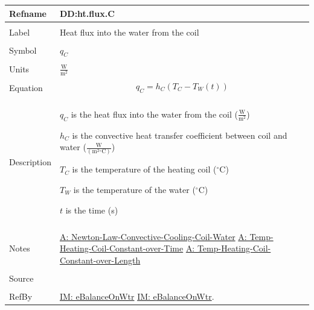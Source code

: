 \documentclass[12pt]{article}
\begin{document}
\noindent \begin{minipage}{\textwidth}
\begin{tabular}{p{} p{}}
\toprule \textbf{Refname} & \textbf{DD:ht.flux.C}
\label{DD:ht.flux.C}
\\ \midrule \\
Label & Heat flux into the water from the coil
\\ \midrule \\
Symbol & ${q_{C}}$
\\ \midrule \\
Units & $\frac{\text{W}}{\text{m}^{2}}$
\\ \midrule \\
Equation & \begin{displaymath}
           {q_{C}}={h_{C}} \left({T_{C}}-{T_{W}}\left(t\right)\right)
           \end{displaymath}
\\ \midrule \\
Description & \begin{symbDescription}
              \item{${q_{C}}$ is the heat flux into the water from the coil ($\frac{\text{W}}{\text{m}^{2}}$)}
              \item{${h_{C}}$ is the convective heat transfer coefficient between coil and water ($\frac{\text{W}}{(\text{m}^{2}{}^{\circ}\text{C})}$)}
              \item{${T_{C}}$ is the temperature of the heating coil (${}^{\circ}$C)}
              \item{${T_{W}}$ is the temperature of the water (${}^{\circ}$C)}
              \item{$t$ is the time (s)}
              \end{symbDescription}
\\ \midrule \\
Notes & \hyperref[assumpLCCCW]{A: Newton-Law-Convective-Cooling-Coil-Water}
        \hyperref[assumpTHCCoT]{A: Temp-Heating-Coil-Constant-over-Time}
        \hyperref[assumpTHCCoL]{A: Temp-Heating-Coil-Constant-over-Length}
\\ \midrule \\
Source & \cite{koothoor2013}
\\ \midrule \\
RefBy & \hyperref[IM:eBalanceOnWtr]{IM: eBalanceOnWtr} \hyperref[IM:eBalanceOnWtr]{IM: eBalanceOnWtr}.
\\ \bottomrule \end{tabular}
\end{minipage}
\par~
\end{document}
